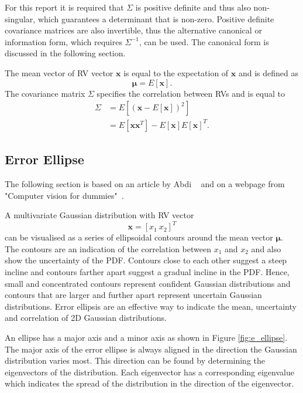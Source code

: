 \documentclass[12pt,oneside,openany,a4paper, %
afrikaans,english,
]{memoir}
\numberwithin{equation}{chapter}
\begin{document}
For this report it is required that $\Sigma$ is positive definite and thus also non-singular, which guarantees a determinant that is non-zero. Positive definite covariance matrices are also invertible, thus the alternative canonical or information form, which requires $\Sigma^{-1}$, can be used. The canonical form is discussed in the following section.

The mean vector of RV vector $\bm{x}$ is equal to the expectation of $\bm{x}$ and is defined as
\begin{equation}
\bm{\mu} = E[\bm{x}].
\end{equation}
The covariance matrix $\Sigma$ specifies the correlation between RVs and is equal to
\begin{equation}
\begin{split}
\Sigma & = E\left[(\bm{x} - E[\bm{x}])^2\right]\\
& = E[\bm{xx}^T] - E[\bm{x}]E[\bm{x}]^T.
\end{split}
\end{equation}
\subsection{Error Ellipse}The following section is based on an article by Abdi ~\cite{abdi} and on a webpage from "Computer vision for dummies"~\cite{draw_ellipse}.

A multivariate Gaussian distribution with RV vector
\begin{equation}
\bm{x} = [x_1\ x_2]^T
\end{equation}
can be visualised as a series of ellipsoidal contours around the mean vector $\bm{\mu}$. The contours are an indication of the correlation between $x_1$ and $x_2$ and also show the uncertainty of the PDF. Contours close to each other suggest a steep incline and contours farther apart suggest a gradual incline in the PDF. Hence, small and concentrated contours represent confident Gaussian distributions and contours that are larger and further apart represent uncertain Gaussian distributions. Error ellipsis are an effective way to indicate the mean, uncertainty and correlation of 2D Gaussian distributions.

An ellipse has a major axis and a minor axis as shown in Figure \ref{fig:e_ellipse}. The major axis of the error ellipse is always aligned in the direction the Gaussian distribution varies most. This direction can be found by determining the eigenvectors of the distribution. Each eigenvector has a corresponding eigenvalue which indicates the spread of the distribution in the direction of the eigenvector. 
\end{document}
